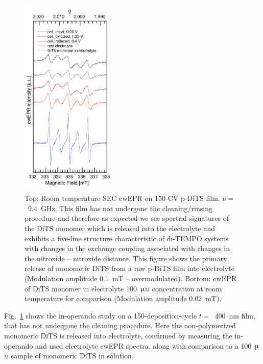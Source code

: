 \begin{figure}%
\includegraphics[width=0.40\textwidth]{./operando_epr/figures/Figure_S5}
\caption{Top: Room temperature SEC cwEPR on 150-CV p-DiTS film. $\nu=$~9.4~GHz. This film has not undergone the cleaning/rinsing procedure and therefore as expected we see spectral signatures of the DiTS monomer which is released into the electrolyte and exhibits a five-line structure characteristic of di-TEMPO systems with changes in the exchange coupling associated with changes in the nitroxide -- nitroxide distance. This figure shows the primary release of monomeric DiTS from a raw p-DiTS film into electrolyte (Modulation amplitude 0.1~mT -- overmodulated). Bottom: cwEPR of DiTS monomer in electrolyte 100~$\muup$\textsc{m} concentration at room temperature for comparison (Modulation amplitude 0.02~mT).}
\label{fig:S5}
\end{figure}


Fig.~\ref{fig:S5} shows the in-operando study on a 150-deposition-cycle $t =$~400~nm film, that has not undergone the cleaning procedure. Here the non-polymerized monomeric DiTS is released into electrolyte, confirmed by measuring the in-operando and used electrolyte cwEPR spectra, along with comparison to a 100~$\muup$\textsc{m} sample of monomeric DiTS in solution.


